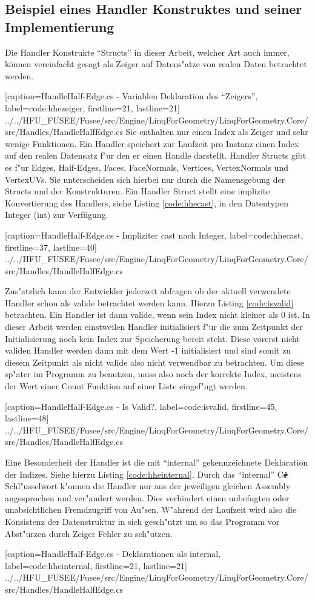 \documentclass[pagesize, paper=a4, fontsize=12pt,titlepage=true, headings=small, headnosepline, abstractoff, liststotoc, nochapterprefix, plainheadsepline]{scrreprt}
\newcommand{\CSS}{C\texttt{\# }}
\begin{document}
		\subsection {Beispiel eines Handler Konstruktes und seiner Implementierung}
Die Handler Konstrukte "`Structs"' in dieser Arbeit, welcher Art auch immer, können vereinfacht gesagt als Zeiger auf Datens"atze von realen Daten betrachtet werden.

			[caption={HandleHalf-Edge.cs - Variablen Deklaration des "`Zeigers"'}, label=code:hhezeiger, firstline=21, lastline=21]
			{../../HFU_FUSEE/Fusee/src/Engine/LinqForGeometry/LinqForGeometry.Core/src/Handles/HandleHalfEdge.cs}
Sie enthalten nur einen Index als Zeiger und sehr wenige Funktionen. Ein Handler speichert zur Laufzeit pro Instanz einen Index auf den realen Datensatz f"ur den er einen Handle darstellt. Handler Structs gibt es f"ur Edges, Half-Edges, Faces, FaceNormals, Vertices, VertexNormals und VertexUVs. Sie unterscheiden sich hierbei nur durch die Namensgebung der Structs und der Konstrukturen.
Ein Handler Struct stellt eine implizite Konvertierung des Handlers, siehe Listing \ref{code:hhecast}, in den Datentypen Integer (int) zur Verfügung.

			[caption={HandleHalf-Edge.cs - Impliziter cast nach Integer}, label=code:hhecast, firstline=37, lastline=40]
			{../../HFU_FUSEE/Fusee/src/Engine/LinqForGeometry/LinqForGeometry.Core/src/Handles/HandleHalfEdge.cs}

Zus"atzlich kann der Entwickler jederzeit abfragen ob der aktuell verwendete Handler schon als valide betrachtet werden kann. Hierzu Listing \ref{code:isvalid} betrachten. Ein Handler ist dann valide, wenn sein Index nicht kleiner als 0 ist. In dieser Arbeit werden einstweilen Handler initialisiert f"ur die zum Zeitpunkt der Initialisierung noch kein Index zur Speicherung bereit steht. Diese vorerst nicht validen Handler werden dann mit dem Wert -1 initialisiert und sind somit zu diesem Zeitpunkt als nicht valide also nicht verwendbar zu betrachten. Um diese sp"ater im Programm zu benutzen, muss also noch der korrekte Index, meistens der Wert einer Count Funktion auf einer Liste eingef"ugt werden.

			[caption={HandleHalf-Edge.cs - Is Valid?}, label=code:isvalid, firstline=45, lastline=48]
			{../../HFU_FUSEE/Fusee/src/Engine/LinqForGeometry/LinqForGeometry.Core/src/Handles/HandleHalfEdge.cs}

Eine Besonderheit der Handler ist die mit "`internal"' gekennzeichnete Deklaration der Indizes. Siehe hierzu Listing \ref{code:hheinternal}. Durch das "`internal"' \CSS Schl"usselwort k"onnen die Handler nur aus der jeweiligen gleichen Assembly angesprochen und ver"andert werden. Dies verhindert einen unbefugten oder unabsichtlichen Fremdzugriff von Au"sen. W"ahrend der Laufzeit wird also die Konsistenz der Datenstruktur in sich gesch"utzt um so das Programm vor Abst"urzen durch Zeiger Fehler zu sch"utzen.

			[caption={HandleHalf-Edge.cs - Deklarationen als internal}, label=code:hheinternal, firstline=21, lastline=21]
			{../../HFU_FUSEE/Fusee/src/Engine/LinqForGeometry/LinqForGeometry.Core/src/Handles/HandleHalfEdge.cs}
\end{document}
